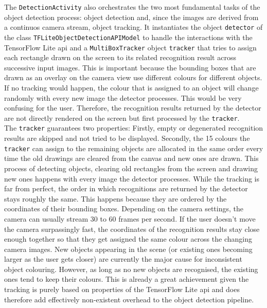 \documentclass[
			   fontsize=11pt,
               paper=a4,
               bibliography=totoc,
               idxtotoc,
               headsepline,
               footsepline,
               footinclude=false,
               BCOR=12mm,
               DIV=13,
               openany,   %
               ]
               {scrbook}
\newcommand{\code}[1]{\lstinline[basicstyle = \ttfamily\small]{#1}} %
\begin{document}
The \code{DetectionActivity} also orchestrates the two most fundamental tasks of the object detection process: object detection and, since the images are derived from a continuos camera stream, object tracking. It instantiates the object \code{detector} of the class \code{TFLiteObjectDetectionAPIModel} to handle the interactions with the TensorFlow Lite \gls{api} and a \code{MultiBoxTracker} object \code{tracker} that tries to assign each rectangle drawn on the screen to its related recognition result across successive input images. This is important because the bounding boxes that are drawn as an overlay on the camera view use different colours for different objects. If no tracking would happen, the colour that is assigned to an object will change randomly with every new image the detector processes. This would be very confusing for the user. Therefore, the recognition results returned by the detector are not directly rendered on the screen but first processed by the \code{tracker}. \\

The \code{tracker} guarantees two properties: Firstly, empty or degenerated recognition results are skipped and not tried to be displayed. Secondly, the 15 colours the \code{tracker} can assign to the remaining objects are  allocated in the same order every time the old drawings are cleared from the canvas and new ones are drawn. This process of detecting objects, clearing old rectangles from the screen and drawing new ones happens with every image the detector processes. While the tracking is far from perfect, the order in which recognitions are returned by the detector stays roughly the same. This happens because they are ordered by the coordinates of their bounding boxes. Depending on the camera settings, the camera can usually stream 30 to 60 frames per second. If the user doesn't move the camera surpassingly fast, the coordinates of the recognition results stay close enough together so that they get assigned the same colour across the changing camera images. New  objects appearing in the scene (or existing ones becoming larger as the user gets closer) are currently the major cause for inconsistent object colouring. However, as long as no new objects are recognised, the existing ones tend to keep their colours. This is already a great achievement given the tracking is purely based on properties of the TensorFlow Lite \gls{api} and does therefore add effectively non-existent overhead to the object detection pipeline. \\
\end{document}
